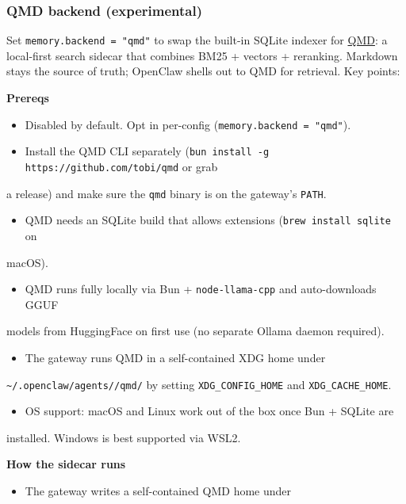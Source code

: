 \subsubsection{QMD backend (experimental)}


Set \texttt{memory.backend = "qmd"} to swap the built-in SQLite indexer for
\href{https://github.com/tobi/qmd}{QMD}: a local-first search sidecar that combines
BM25 + vectors + reranking. Markdown stays the source of truth; OpenClaw shells
out to QMD for retrieval. Key points:

\textbf{Prereqs}

\begin{itemize}
  \item Disabled by default. Opt in per-config (\texttt{memory.backend = "qmd"}).
  \item Install the QMD CLI separately (\texttt{bun install -g https://github.com/tobi/qmd} or grab
\end{itemize}

a release) and make sure the \texttt{qmd} binary is on the gateway’s \texttt{PATH}.
\begin{itemize}
  \item QMD needs an SQLite build that allows extensions (\texttt{brew install sqlite} on
\end{itemize}

macOS).
\begin{itemize}
  \item QMD runs fully locally via Bun + \texttt{node-llama-cpp} and auto-downloads GGUF
\end{itemize}

models from HuggingFace on first use (no separate Ollama daemon required).
\begin{itemize}
  \item The gateway runs QMD in a self-contained XDG home under
\end{itemize}

\texttt{\textasciitilde{}/.openclaw/agents//qmd/} by setting \texttt{XDG\_CONFIG\_HOME} and
\texttt{XDG\_CACHE\_HOME}.
\begin{itemize}
  \item OS support: macOS and Linux work out of the box once Bun + SQLite are
\end{itemize}

installed. Windows is best supported via WSL2.

\textbf{How the sidecar runs}

\begin{itemize}
  \item The gateway writes a self-contained QMD home under
\end{itemize}

